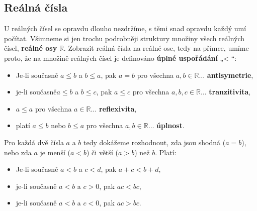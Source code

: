     \subsection{Reálná čísla}
      U reálných čísel se opravdu dlouho nezdržíme, s těmi snad opravdu každý umí počítat. Všimneme 
      si jen trochu podrobněji struktury množiny všech reálných čísel, \textbf{reálné osy} 
      \(\mathbb{R}\). Zobrazit  reálná čísla na reálné ose, tedy na přímce, umíme proto, že na 
      množině reálných čísel je definováno \textbf{úplné uspořádání} „< “:
      \begin{itemize}
        \item Je-li současně \(a ≤ b\) a \(b ≤ a\), pak \(a = b\) 
              pro všechna \(a, b\in\mathbb{R}\ldots\) \textbf{antisymetrie},
        \item je-li současně\( a ≤ b\) a \(b ≤ c\), pak \(a ≤ c\) 
              pro všechna \(a,b,c\in\mathbb{R}\ldots\) \textbf{tranzitivita},
        \item \(a ≤ a\) pro všechna \(a\in\mathbb{R}\ldots\) \textbf{reflexivita},
        \item platí \(a ≤ b\) nebo \(b ≤ a\) pro všechna \(a, b \in\mathbb{R}\ldots\) 
              \textbf{úplnost}.
      \end{itemize}
      Pro každá dvě čísla \(a\) a \(b\) tedy dokážeme rozhodnout, zda jsou shodná (\(a = b\)), nebo 
      zda \(a\) je menší (\(a < b\)) či větší (\(a > b\)) než \(b\). Platí:
      \begin{itemize}
        \item Je-li současně \(a < b\) a \(c < d\), pak \(a + c < b + d\),
        \item je-li současně \(a < b\) a \(c > 0\), pak \(ac < bc\),
        \item je-li současně \(a < b\) a \(c < 0\), pak \(ac > bc\).
      \end{itemize}
      
